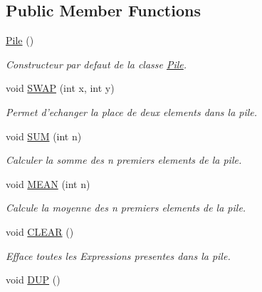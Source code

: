 \subsection*{\-Public \-Member \-Functions}
\begin{DoxyCompactItemize}
\item 
\hyperlink{class_l_o21_1_1_pile_aace652ebfd029827297fdedc294288f2}{\-Pile} ()
\begin{DoxyCompactList}\small\item\em \-Constructeur par defaut de la classe \hyperlink{class_l_o21_1_1_pile}{\-Pile}. \end{DoxyCompactList}\item 
void \hyperlink{class_l_o21_1_1_pile_a9d322532282fb52a1bdd0d870c77f381}{\-S\-W\-A\-P} (int x, int y)
\begin{DoxyCompactList}\small\item\em \-Permet d'echanger la place de deux elements dans la pile. \end{DoxyCompactList}\item 
\hypertarget{class_l_o21_1_1_pile_a921e68479ce5ac4e609903da41b0a4e6}{void \hyperlink{class_l_o21_1_1_pile_a921e68479ce5ac4e609903da41b0a4e6}{\-S\-U\-M} (int n)}\label{class_l_o21_1_1_pile_a921e68479ce5ac4e609903da41b0a4e6}

\begin{DoxyCompactList}\small\item\em \-Calculer la somme des n premiers elements de la pile. \end{DoxyCompactList}\item 
\hypertarget{class_l_o21_1_1_pile_adea674770f7f3957c0ba6368ca61e302}{void \hyperlink{class_l_o21_1_1_pile_adea674770f7f3957c0ba6368ca61e302}{\-M\-E\-A\-N} (int n)}\label{class_l_o21_1_1_pile_adea674770f7f3957c0ba6368ca61e302}

\begin{DoxyCompactList}\small\item\em \-Calcule la moyenne des n premiers elements de la pile. \end{DoxyCompactList}\item 
\hypertarget{class_l_o21_1_1_pile_aac45f9bf192afd3738c981ef1a934bc0}{void \hyperlink{class_l_o21_1_1_pile_aac45f9bf192afd3738c981ef1a934bc0}{\-C\-L\-E\-A\-R} ()}\label{class_l_o21_1_1_pile_aac45f9bf192afd3738c981ef1a934bc0}

\begin{DoxyCompactList}\small\item\em \-Efface toutes les \-Expressions presentes dans la pile. \end{DoxyCompactList}\item 
\hypertarget{class_l_o21_1_1_pile_a787e1174fff99237d055fb2818fa3996}{void \hyperlink{class_l_o21_1_1_pile_a787e1174fff99237d055fb2818fa3996}{\-D\-U\-P} ()}\label{class_l_o21_1_1_pile_a787e1174fff99237d055fb2818fa3996}


\end{DoxyCompactItemize}
